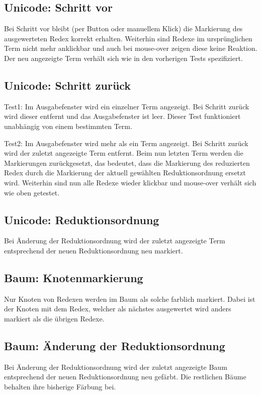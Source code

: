 \documentclass[parskip=full,11pt,openany]{scrreprt}
\begin{document}
\subsection{Unicode: Schritt vor}
Bei Schritt vor bleibt (per Button oder manuellem Klick) die Markierung des ausgewerteten Redex korrekt erhalten. Weiterhin sind Redexe im ursprünglichen Term nicht mehr anklickbar und auch bei mouse-over zeigen diese keine Reaktion. Der neu angezeigte Term verhält sich wie in den vorherigen Tests spezifiziert.

\subsection{Unicode: Schritt zurück}
Test1: 
Im Ausgabefenster wird ein einzelner Term angezeigt. Bei Schritt zurück wird dieser entfernt und das Ausgabefenster ist leer. 
Dieser Test funktioniert unabhängig von einem bestimmten Term.

Test2: 
Im Ausgabefenster wird mehr als ein Term angezeigt. Bei Schritt zurück wird der zuletzt angezeigte Term entfernt.
Beim nun letzten Term werden die Markierungen zurückgesetzt, das bedeutet, dass die Markierung des reduzierten Redex durch die Markierung der aktuell gewählten Reduktionsordnung ersetzt wird. Weiterhin sind nun alle Redexe wieder klickbar und mouse-over verhält sich wie oben getestet.

\subsection{Unicode: Reduktionsordnung}
Bei Änderung der Reduktionsordnung wird der zuletzt angezeigte Term entsprechend der neuen Reduktionsordnung neu markiert. 

\subsection{Baum: Knotenmarkierung}
Nur Knoten von Redexen werden im Baum als solche farblich markiert. Dabei ist der Knoten mit dem Redex, welcher als nächstes ausgewertet wird anders markiert als die übrigen Redexe.

\subsection{Baum: Änderung der Reduktionsordnung}
Bei Änderung der Reduktionsordnung wird der zuletzt angezeigte Baum entsprechend der neuen Reduktionsordnung neu gefärbt. Die restlichen Bäume behalten ihre bisherige Färbung bei.
\end{document}
